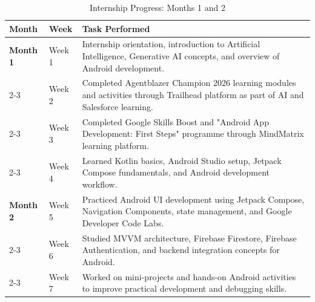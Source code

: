 \documentclass[12pt,a4paper]{report}
\begin{document}
\begin{table}[H]
\centering
\noindent\begin{tabularx}{\textwidth}{|l|l|X|}
\hline
\rowcolor[gray]{0.9} \textbf{Month} & \textbf{Week} & \textbf{Task Performed} \\ \hline
\textbf{Month 1} & Week 1 & Internship orientation, introduction to Artificial Intelligence, Generative AI concepts, and overview of Android development. \\ \cline{2-3} 
 & Week 2 & Completed Agentblazer Champion 2026 learning modules and activities through Trailhead platform as part of AI and Salesforce learning. \\ \cline{2-3} 
 & Week 3 & Completed Google Skills Boost and "Android App Development: First Steps" programme through MindMatrix learning platform. \\ \cline{2-3} 
 & Week 4 & Learned Kotlin basics, Android Studio setup, Jetpack Compose fundamentals, and Android development workflow. \\ \hline
\textbf{Month 2} & Week 5 & Practiced Android UI development using Jetpack Compose, Navigation Components, state management, and Google Developer Code Labs. \\ \cline{2-3} 
 & Week 6 & Studied MVVM architecture, Firebase Firestore, Firebase Authentication, and backend integration concepts for Android. \\ \cline{2-3} 
 & Week 7 & Worked on mini-projects and hands-on Android activities to improve practical development and debugging skills. \\ \hline
\end{tabularx}
\caption{Internship Progress: Months 1 and 2}
\end{table}

\newpage
\end{document}
